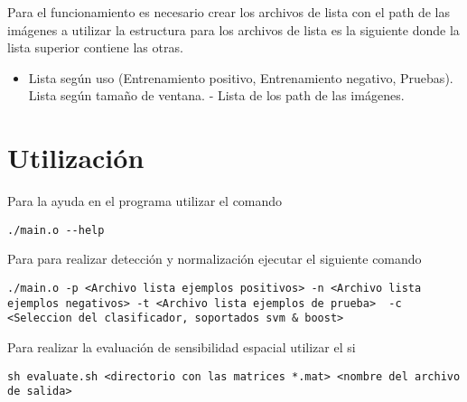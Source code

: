 Para el funcionamiento es necesario crear los archivos de lista con el path de las imágenes a utilizar la estructura para los archivos de lista es la siguiente donde la lista superior contiene las otras.

\begin{itemize}
\item Lista según uso (Entrenamiento positivo, Entrenamiento negativo, Pruebas).
\subitem * Lista según tamaño de ventana.
\subsubitem     - Lista de los path de las imágenes.
\end{itemize}


\section{Utilización}

Para la ayuda en el programa utilizar el comando

\begin{lstlisting}
./main.o --help 
\end{lstlisting}

Para para realizar detección y normalización ejecutar el siguiente comando

\begin{lstlisting}
./main.o -p <Archivo lista ejemplos positivos> -n <Archivo lista ejemplos negativos> -t <Archivo lista ejemplos de prueba>  -c <Seleccion del clasificador, soportados svm & boost>
\end{lstlisting}

Para realizar la evaluación de sensibilidad espacial utilizar el si

\begin{lstlisting}
sh evaluate.sh <directorio con las matrices *.mat> <nombre del archivo de salida>
\end{lstlisting}